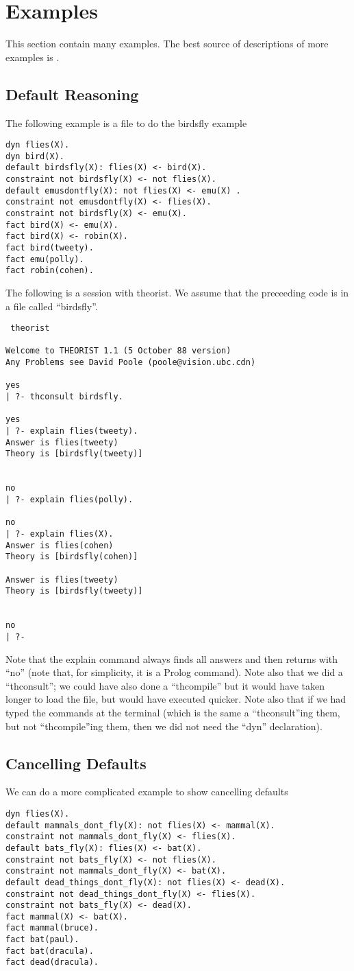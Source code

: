 \section{Examples}
This section contain many examples. The best source of descriptions of
more examples is \cite{poole:meth}.
\subsection{Default Reasoning}
The following example is a file to do the birdsfly example
\begin{verbatim}
dyn flies(X).
dyn bird(X).
default birdsfly(X): flies(X) <- bird(X).
constraint not birdsfly(X) <- not flies(X).
default emusdontfly(X): not flies(X) <- emu(X) .
constraint not emusdontfly(X) <- flies(X).
constraint not birdsfly(X) <- emu(X).
fact bird(X) <- emu(X).
fact bird(X) <- robin(X).
fact bird(tweety).
fact emu(polly).
fact robin(cohen).
\end{verbatim}

The following is a session with theorist. We assume that the preceeding code
is in a file called ``birdsfly''.
\begin{verbatim}
 theorist

Welcome to THEORIST 1.1 (5 October 88 version)
Any Problems see David Poole (poole@vision.ubc.cdn)

yes
| ?- thconsult birdsfly.

yes
| ?- explain flies(tweety).
Answer is flies(tweety)
Theory is [birdsfly(tweety)]


no
| ?- explain flies(polly).

no
| ?- explain flies(X).
Answer is flies(cohen)
Theory is [birdsfly(cohen)]

Answer is flies(tweety)
Theory is [birdsfly(tweety)]


no
| ?- 
\end{verbatim}

Note that the explain command always finds all answers and 
then returns with ``no''
(note that, for simplicity, it is a Prolog command).
Note also that we did a ``thconsult''; we could have also done a ``thcompile''
but it would have taken longer to load the file, but would have executed
quicker. Note also that if we had typed the commands at the terminal
(which is the same a ``thconsult''ing them, but not ``thcompile''ing them, then
we did not need the ``dyn'' declaration).
\subsection{Cancelling Defaults}
We can do a more complicated example to show cancelling defaults
\begin{verbatim}
dyn flies(X).
default mammals_dont_fly(X): not flies(X) <- mammal(X).
constraint not mammals_dont_fly(X) <- flies(X).
default bats_fly(X): flies(X) <- bat(X).
constraint not bats_fly(X) <- not flies(X).
constraint not mammals_dont_fly(X) <- bat(X).
default dead_things_dont_fly(X): not flies(X) <- dead(X).
constraint not dead_things_dont_fly(X) <- flies(X).
constraint not bats_fly(X) <- dead(X).
fact mammal(X) <- bat(X).
fact mammal(bruce).
fact bat(paul).
fact bat(dracula).
fact dead(dracula).
\end{verbatim}

